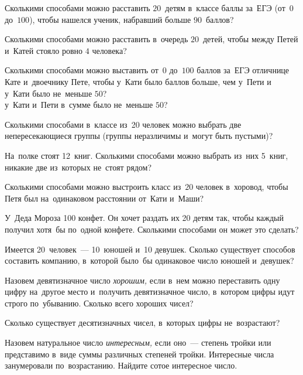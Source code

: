 


\begin{problems}

\item
Сколькими способами можно расставить $20$~детям в~классе баллы за~ЕГЭ
(от~$0$ до~$100$), чтобы нашелся ученик, набравший больше $90$~баллов?

\item
Сколькими способами можно расставить в~очередь $20$~детей, чтобы между Петей
и~Катей стояло ровно $4$ человека?

\item
Сколькими способами можно выставить от~$0$ до~$100$ баллов за~ЕГЭ
отличнице Кате и~двоечнику Пете, чтобы у~Кати было баллов больше, чем у~Пети и
\\
\subproblem
у~Кати было не~меньше $50$?
\\
\subproblem
у~Кати и~Пети в~сумме было не~меньше $50$?

\item
Сколькими способами в~классе из~20 человек можно выбрать две непересекающиеся
группы (группы неразличимы и~могут быть пустыми)?

\item
На~полке стоят 12~книг.
Сколькими способами можно выбрать из~них 5~книг, никакие две из~которых
не~стоят рядом?

\item
Сколькими способами можно выстроить класс из~$20$ человек в~хоровод, чтобы Петя
был на~одинаковом расстоянии от~Кати и~Маши?

\item
У~Деда Мороза 100 конфет.
Он хочет раздать их 20 детям так, чтобы каждый получил хотя~бы по~одной
конфете.
Сколькими способами он может это сделать?

\item
Имеется 20~человек~--- 10~юношей и~10 девушек.
Сколько существует способов составить компанию, в~которой было~бы одинаковое
число юношей и~девушек?

\item
Назовем девятизначное число \emph{хорошим,} если в~нем можно переставить одну
цифру на~другое место и~получить девятизначное число, в~котором цифры
идут строго по~убыванию.
Сколько всего хороших чисел?

\item
Сколько существует десятизначных чисел, в~которых цифры не~возрастают?

\item
Назовем натуральное число \emph{интересным,} если оно~--- степень тройки или
представимо в~виде суммы различных степеней тройки.
Интересные числа занумеровали по~возрастанию.
Найдите сотое интересное число.

\end{problems}

